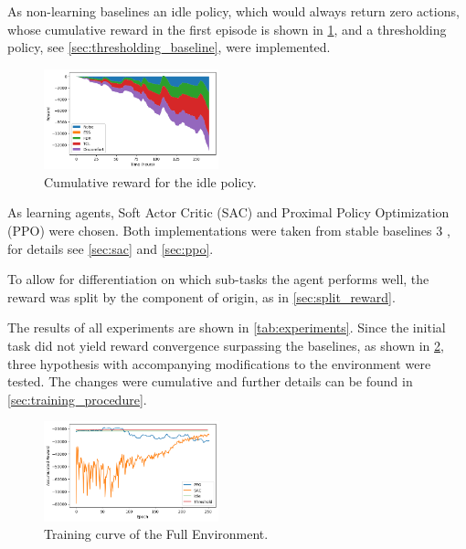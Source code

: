 As non-learning baselines an idle policy, which would always return zero actions, whose cumulative reward in the first episode is shown in \cref{fig:reward_idle}, and a thresholding policy, see \cref{sec:thresholding_baseline}, were implemented.

\begin{figure}[H]
    \centering
    \includegraphics[width=0.45\textwidth]{figures/idle_reward.png}
    \caption{Cumulative reward for the idle policy.}
    \label{fig:reward_idle}
\end{figure}

As learning agents, Soft Actor Critic (SAC) \cite{Haarnoja.04.01.2018} and Proximal Policy Optimization (PPO) \cite{Schulman.20.07.2017} were chosen. Both implementations were taken from stable baselines 3 \cite{AntoninRaffin.2021}, for details see \cref{sec:sac} and \cref{sec:ppo}.
\par
To allow for differentiation on which sub-tasks the agent performs well, the reward was split by the component of origin, as in \cref{sec:split_reward}. 
\par
The results of all experiments are shown in \cref{tab:experiments}. Since the initial task did not yield reward convergence surpassing the baselines, as shown in \cref{fig:training_curve}, three hypothesis with accompanying modifications to the environment were tested. The changes were cumulative and further details can be found in \cref{sec:training_procedure}.
\begin{figure}[H]
    \centering
    \setlength{\abovecaptionskip}{0pt}
    \includegraphics[width=0.45\textwidth]{figures/training_curve.png}
    \caption{Training curve of the Full Environment.}
    \label{fig:training_curve}
\end{figure}


